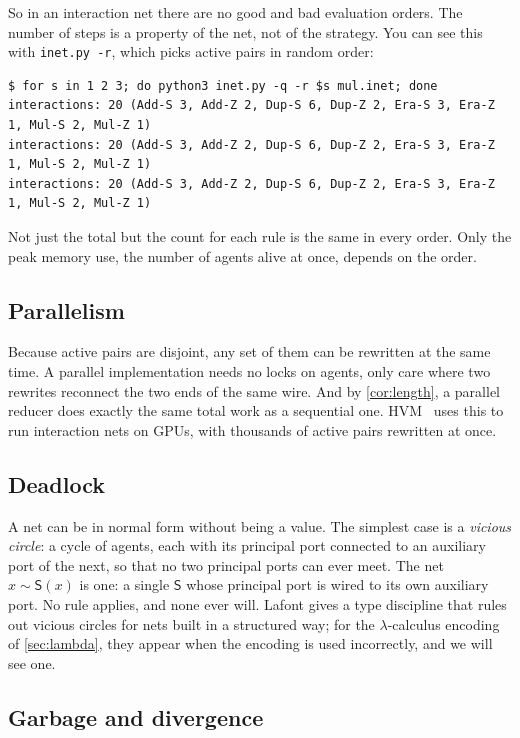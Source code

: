 \documentclass[11pt,a4paper]{article}
\newcommand{\ag}[1]{\mathsf{#1}}
\newcommand{\Sa}{\ag{S}}
\newcommand{\eqn}{\mathrel{\sim}}
\theoremstyle{definition}
\theoremstyle{plain}
\begin{document}
\noindent
So in an interaction net there are no good and bad evaluation orders. The
number of steps is a property of the net, not of the strategy. You can see
this with \texttt{inet.py -r}, which picks active pairs in random order:
\begin{lstlisting}[style=trace]
$ for s in 1 2 3; do python3 inet.py -q -r $s mul.inet; done
interactions: 20 (Add-S 3, Add-Z 2, Dup-S 6, Dup-Z 2, Era-S 3, Era-Z 1, Mul-S 2, Mul-Z 1)
interactions: 20 (Add-S 3, Add-Z 2, Dup-S 6, Dup-Z 2, Era-S 3, Era-Z 1, Mul-S 2, Mul-Z 1)
interactions: 20 (Add-S 3, Add-Z 2, Dup-S 6, Dup-Z 2, Era-S 3, Era-Z 1, Mul-S 2, Mul-Z 1)
\end{lstlisting}
Not just the total but the count for each rule is the same in every order.
Only the peak memory use, the number of agents alive at once, depends on the
order.

\subsection{Parallelism}

Because active pairs are disjoint, any set of them can be rewritten at the
same time. A parallel implementation needs no locks on agents, only care
where two rewrites reconnect the two ends of the same wire. And by
\cref{cor:length}, a parallel reducer does exactly the same total work as a
sequential one. HVM~\cite{hvm} uses this to run interaction nets on GPUs, with
thousands of active pairs rewritten at once.

\subsection{Deadlock}

A net can be in normal form without being a value. The simplest case is a
\emph{vicious circle}: a cycle of agents, each with its principal port
connected to an auxiliary port of the next, so that no two principal ports
can ever meet. The net $x \eqn \Sa(x)$ is one: a single $\Sa$ whose principal
port is wired to its own auxiliary port. No rule applies, and none ever will.
Lafont gives a type discipline that rules out vicious circles for nets built
in a structured way; for the $\lambda$-calculus encoding of
\cref{sec:lambda}, they appear when the encoding is used incorrectly, and we
will see one.

\subsection{Garbage and divergence}\label{sec:garbage}
\end{document}
